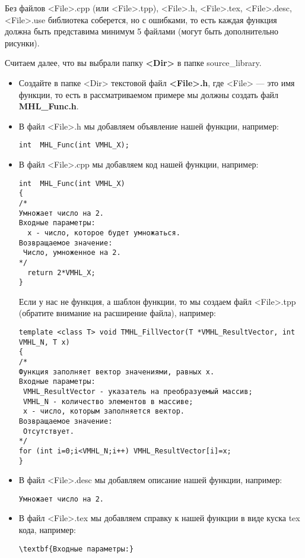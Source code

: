 \documentclass[a4paper,12pt]{article}
\begin{document}
Без файлов <File>.cpp (или <File>.tpp), <File>.h, <File>.tex, <File>.desc, <File>.use библиотека соберется, но с ошибками, то есть каждая функция должна быть представима минимум 5 файлами (могут быть дополнительно рисунки).

Считаем далее, что вы выбрали папку \textbf{<Dir>} в папке source\_library. 

\begin{itemize}
\item Создайте в папке <Dir> текстовой файл \textbf{<File>.h}, где <File> --- это имя функции, то есть в рассматриваемом примере мы должны создать файл \textbf{MHL\_Func.h}.
\item В файл <File>.h мы добавляем объявление нашей функции, например:
\begin{lstlisting}[label=examplefileh, caption=Содержимое MHL\_Func.h]
int  MHL_Func(int VMHL_X);
\end{lstlisting}
\item В файл <File>.cpp мы добавляем код нашей функции, например:
\begin{lstlisting}[label=examplefilecpp, caption=Содержимое MHL\_Func.cpp]
int  MHL_Func(int VMHL_X)
{
/*
Умножает число на 2.
Входные параметры:
  x - число, которое будет умножаться.
Возвращаемое значение:
 Число, умноженное на 2.
*/
  return 2*VMHL_X;
}
\end{lstlisting}

Если у нас не функция, а шаблон функции, то мы создаем файл <File>.tpp (обратите внимание на расширение файла), например:
\begin{lstlisting}[label=examplefiletpp, caption=Содержимое TMHL\_FillVector.tpp]
template <class T> void TMHL_FillVector(T *VMHL_ResultVector, int VMHL_N, T x)
{
/*
Функция заполняет вектор значениями, равных x.
Входные параметры:
 VMHL_ResultVector - указатель на преобразуемый массив;
 VMHL_N - количество элементов в массиве;
 x - число, которым заполняется вектор.
Возвращаемое значение:
 Отсутствует.
*/
for (int i=0;i<VMHL_N;i++) VMHL_ResultVector[i]=x;
}
\end{lstlisting}

\item В файл <File>.desc мы добавляем описание нашей функции, например:
\begin{lstlisting}[label=examplefiledesc, caption=Содержимое MHL\_Func.desc]
Умножает число на 2.
\end{lstlisting}

\item В файл <File>.tex мы добавляем справку к нашей функции в виде куска tex кода, например:
\begin{lstlisting}[label=examplefiletex, caption=Содержимое MHL\_Func.tex]
\textbf{Входные параметры:}


\end{lstlisting}
\end{itemize}
\end{document}
